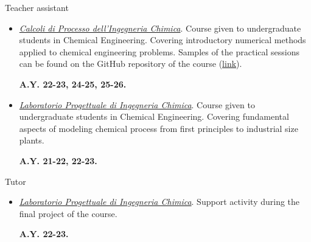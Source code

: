 \begin{position_simple}{Teacher assistant}{\polimi}
    \begin{itemize}
        \item[ ]
              \begin{minipage}[t]{0.75\textwidth}
                  \ul{\it Calcoli di Processo dell'Ingegneria Chimica}. Course given to
                  undergraduate students in Chemical Engineering. Covering introductory numerical
                  methods applied to chemical engineering problems. Samples of the practical sessions
                  can be found on the GitHub repository of the course
                  (\href{https://github.com/Titodinelli/Calcoli-di-Processo-dell-Ingegneria-Chimica}{link}).
              \end{minipage}
              \begin{minipage}[t]{0.18\textwidth}
                  \begin{flushright}
                      \bfseries A.Y. 22-23, 24-25, 25-26.
                  \end{flushright}
              \end{minipage}

        \item[ ]
              \begin{minipage}[t]{0.75\textwidth}
                  \ul{\it Laboratorio Progettuale di Ingegneria Chimica}. Course given to
                  undergraduate students in Chemical Engineering. Covering fundamental aspects of
                  modeling chemical process from first principles to industrial size plants.
              \end{minipage}
              \begin{minipage}[t]{0.18\textwidth}
                  \begin{flushright}
                      \bfseries A.Y. 21-22, 22-23.
                  \end{flushright}
              \end{minipage}
    \end{itemize}
\end{position_simple}

\begin{position_simple}{Tutor}{\polimi}
    \begin{itemize}
        \item[ ]
              \begin{minipage}[t]{0.75\textwidth}
                  \ul{\it Laboratorio Progettuale di Ingegneria Chimica}. Support activity during
                  the final project of the course.
              \end{minipage}
              \begin{minipage}[t]{0.18\textwidth}
                  \begin{flushright}
                      \bfseries A.Y. 22-23.
                  \end{flushright}
              \end{minipage}
    \end{itemize}
\end{position_simple}
